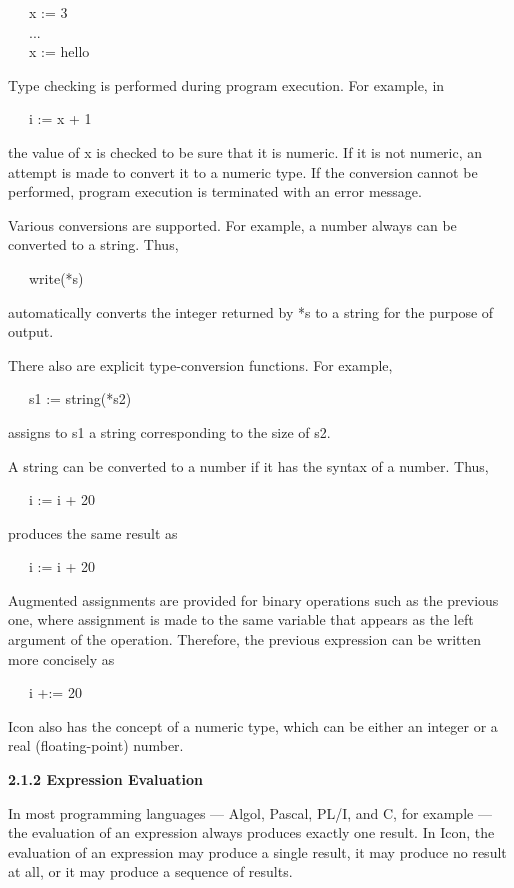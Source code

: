 {\ttfamily\mdseries
\ \ \ x := 3 \\
\ \ \ ... \\
\ \ \ x := {\textquotedbl}hello{\textquotedbl}}

Type checking is performed during program execution. For example, in

{\ttfamily\mdseries
\ \ \ i := x + 1}

the value of x is checked to be sure that it is numeric. If it is not
numeric, an attempt is made to convert it to a numeric type. If the
conversion cannot be performed, program execution is terminated with
an error message.

Various conversions are supported. For example, a number always can be
converted to a string. Thus,

{\ttfamily\mdseries
\ \ \ write(*s)}

\noindent automatically converts the integer returned by *s to a
string for the purpose of output.

There also are explicit type-conversion functions. For example,

{\ttfamily\mdseries
\ \ \ s1 := string(*s2)}

\noindent assigns to s1 a string corresponding to the size of s2.

A string can be converted to a number if it has the syntax of a number. Thus,

{\ttfamily\mdseries
\ \ \ i := i + {\textquotedbl}20{\textquotedbl}}

\noindent produces the same result as

{\ttfamily\mdseries
\ \ \ i := i + 20}


Augmented assignments are provided for binary operations such as the
previous one, where assignment is made to the same variable that
appears as the left argument of the operation. Therefore, the previous
expression can be written more concisely as

{\ttfamily\mdseries
\ \ \ i +:= 20}


Icon also has the concept of a numeric type, which can be either an
integer or a real (floating-point) number.

{\sffamily\bfseries
2.1.2 Expression Evaluation}


In most programming languages --- Algol, Pascal, PL/I, and C, for
example --- the evaluation of an expression always produces exactly
one result. In Icon, the evaluation of an expression may produce a
single result, it may produce no result at all, or it may produce a
sequence of results.

